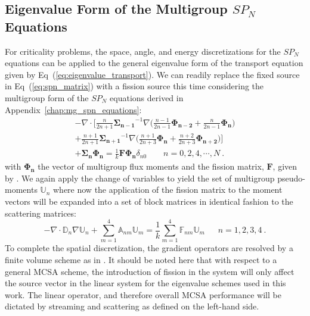 \subsection{Eigenvalue Form of the Multigroup $SP_N$ Equations}
\label{subsec:eigenvalue_form}
For criticality problems, the space, angle, and energy discretizations
for the $SP_N$ equations can be applied to the general eigenvalue form
of the transport equation given by
Eq~(\ref{eq:eigenvalue_transport}). We can readily replace the fixed
source in Eq~(\ref{eq:spn_matrix}) with a fission source this time
considering the multigroup form of the $SP_N$ equations derived in
Appendix~\ref{chap:mg_spn_equations}:
\begin{multline}
  -\nabla \cdot \Bigg[\frac{n}{2n+1}\mathbf{\Sigma_{n-1}}^{-1} \nabla
    \Big(\frac{n-1}{2n-1} \mathbf{\Phi_{n-2}} +
    \frac{n}{2n-1}\mathbf{\Phi_n} \Big) \\+
    \frac{n+1}{2n+1}\mathbf{\Sigma_{n+1}}^{-1} \nabla
    \Big(\frac{n+1}{2n+3}\mathbf{\Phi_n} +
    \frac{n+2}{2n+3}\mathbf{\Phi_{n+2}}\Big) \Bigg] \\+
  \mathbf{\Sigma_n} \mathbf{\Phi_n} = \frac{1}{k} \mathbf{F}
  \mathbf{\Phi_n} \delta_{n0} \ \ \ \ \ \ \ \ \ n = 0,2,4,\cdots,N\:.
  \label{eq:multigroup_spn_eigenvalue}
\end{multline}
with $\mathbf{\Phi_n}$ the vector of multigroup flux moments and the
fission matrix, $\mathbf{F}$, given by
\cite{evans_simplified_2013}. We again apply the change of variables
to yield the set of multigroup pseudo-moments $\mathbb{U}_n$ where now
the application of the fission matrix to the moment vectors will be
expanded into a set of block matrices in identical fashion to the
scattering matrices:
\begin{equation}
  -\nabla \cdot \mathbb{D}_n \nabla \mathbb{U}_n + \sum_{m=1}^4
  \mathbb{A}_{nm} \mathbb{U}_m = \frac{1}{k} \sum_{m=1}^4
  \mathbb{F}_{nm} \mathbb{U}_m\ \ \ \ \ \ \ n = 1,2,3,4\:.
  \label{eq:spn_fission_matrix}
\end{equation}
To complete the spatial discretization, the gradient operators are
resolved by a finite volume scheme as in
\cite{evans_simplified_2013}. It should be noted here that with
respect to a general MCSA scheme, the introduction of fission in the
system will only affect the source vector in the linear system for the
eigenvalue schemes used in this work. The linear operator, and
therefore overall MCSA performance will be dictated by streaming and
scattering as defined on the left-hand side.

